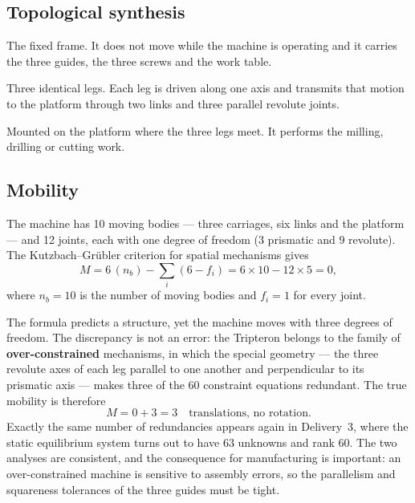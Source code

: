 \documentclass[11pt]{article}
\begin{document}
\subsection{Topological synthesis}

\begin{description}[leftmargin=0pt,style=nextline]
  \item[Base] The fixed frame. It does not move while the machine is operating and it
        carries the three guides, the three screws and the work table.
  \item[Arms] Three identical legs. Each leg is driven along one axis and transmits that
        motion to the platform through two links and three parallel revolute joints.
  \item[Cutting tool] Mounted on the platform where the three legs meet. It performs the
        milling, drilling or cutting work.
\end{description}

\subsection{Mobility}

The machine has 10 moving bodies --- three carriages, six links and the platform --- and
12 joints, each with one degree of freedom (3 prismatic and 9 revolute). The
Kutzbach--Gr\"ubler criterion for spatial mechanisms gives
\begin{equation}
M = 6\,(n_b) - \sum_{i}(6-f_i) = 6\times10 - 12\times5 = 0 ,
\end{equation}
where $n_b=10$ is the number of moving bodies and $f_i=1$ for every joint.

The formula predicts a structure, yet the machine moves with three degrees of freedom.
The discrepancy is not an error: the Tripteron belongs to the family of
\textbf{over-constrained} mechanisms, in which the special geometry --- the three revolute
axes of each leg parallel to one another and perpendicular to its prismatic axis ---
makes three of the 60 constraint equations redundant. The true mobility is therefore
\begin{equation}
M = 0 + 3 = 3 \quad\text{translations, no rotation.}
\end{equation}
Exactly the same number of redundancies appears again in Delivery~3, where the static
equilibrium system turns out to have 63 unknowns and rank 60. The two analyses are
consistent, and the consequence for manufacturing is important: an over-constrained
machine is sensitive to assembly errors, so the parallelism and squareness tolerances of
the three guides must be tight.
\end{document}
